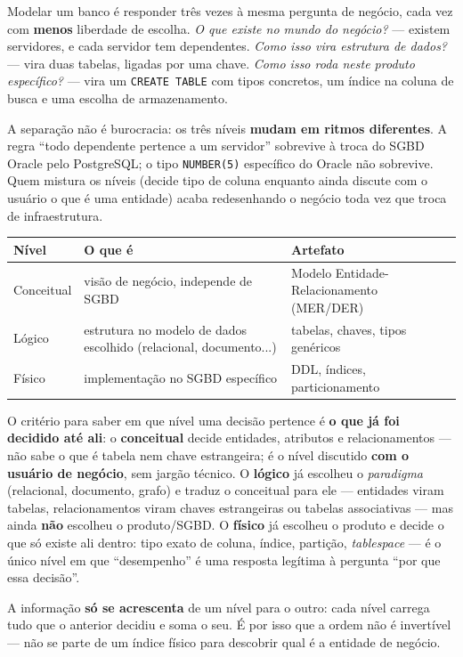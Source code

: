 \begin{conceito}
Modelar um banco é responder três vezes à mesma pergunta de negócio, cada
vez com \textbf{menos} liberdade de escolha. \textit{O que existe no mundo
do negócio?} --- existem servidores, e cada servidor tem dependentes.
\textit{Como isso vira estrutura de dados?} --- vira duas tabelas, ligadas
por uma chave. \textit{Como isso roda neste produto específico?} --- vira
um \texttt{CREATE TABLE} com tipos concretos, um índice na coluna de busca
e uma escolha de armazenamento.

A separação não é burocracia: os três níveis \textbf{mudam em ritmos
diferentes}. A regra “todo dependente pertence a um servidor” sobrevive à
troca do SGBD Oracle pelo PostgreSQL; o tipo \texttt{NUMBER(5)} específico
do Oracle não sobrevive. Quem mistura os níveis (decide tipo de coluna
enquanto ainda discute com o usuário o que é uma entidade) acaba
redesenhando o negócio toda vez que troca de infraestrutura.

\begin{center}
\begin{tabular}{@{}p{2.4cm}p{4.6cm}p{4.6cm}@{}}
\toprule
\textbf{Nível} & \textbf{O que é} & \textbf{Artefato} \\
\midrule
Conceitual & visão de negócio, independe de SGBD & Modelo
Entidade-Relacionamento (MER/DER) \\
Lógico & estrutura no modelo de dados escolhido (relacional, documento...) &
tabelas, chaves, tipos genéricos \\
Físico & implementação no SGBD específico & DDL, índices, particionamento \\
\bottomrule
\end{tabular}
\end{center}

O critério para saber em que nível uma decisão pertence é \textbf{o que já
foi decidido até ali}: o \textbf{conceitual} decide entidades, atributos e
relacionamentos --- não sabe o que é tabela nem chave estrangeira; é o
nível discutido \textbf{com o usuário de negócio}, sem jargão técnico. O
\textbf{lógico} já escolheu o \textit{paradigma} (relacional, documento,
grafo) e traduz o conceitual para ele --- entidades viram tabelas,
relacionamentos viram chaves estrangeiras ou tabelas associativas --- mas
ainda \textbf{não} escolheu o produto/SGBD. O \textbf{físico} já escolheu o
produto e decide o que só existe ali dentro: tipo exato de coluna, índice,
partição, \textit{tablespace} --- é o único nível em que “desempenho” é uma
resposta legítima à pergunta “por que essa decisão”.

A informação \textbf{só se acrescenta} de um nível para o outro: cada nível
carrega tudo que o anterior decidiu e soma o seu. É por isso que a ordem
não é invertível --- não se parte de um índice físico para descobrir qual
é a entidade de negócio.
\end{conceito}

